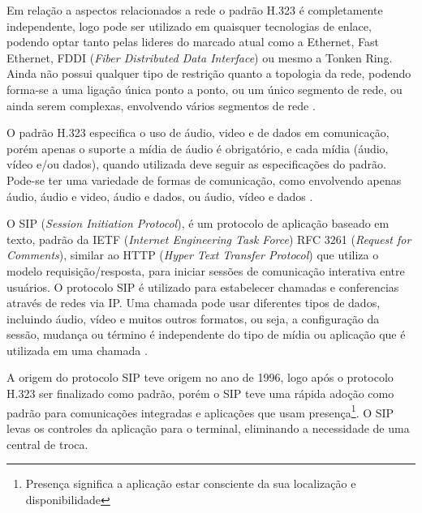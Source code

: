 Em relação a aspectos relacionados a rede o padrão H.323 é completamente independente, logo pode ser utilizado em quaisquer  tecnologias de enlace, podendo optar tanto pelas lideres do marcado atual como a Ethernet, Fast Ethernet, FDDI (\textit{Fiber Distributed Data Interface}) ou mesmo a Tonken Ring. Ainda não possui qualquer tipo de restrição quanto a topologia da rede, podendo forma-se a uma ligação única ponto a ponto, ou um único segmento de rede, ou ainda serem complexas, envolvendo vários segmentos de rede \cite{eduardomaronasmonks2006}.

O padrão H.323 especifica o uso de  áudio, video e de dados em comunicação, porém apenas o suporte a mídia de áudio é obrigatório, e cada mídia (áudio, vídeo e/ou dados), quando utilizada deve seguir as especificações do padrão. Pode-se ter uma variedade de formas de comunicação, como envolvendo apenas áudio, áudio e video, áudio e dados, ou áudio, vídeo e dados \cite{glauciadasilvaribeiro2011}.

O SIP (\textit{Session Initiation Protocol}), é um protocolo de aplicação baseado em texto, padrão da IETF (\textit{Internet Engineering Task Force}) RFC 3261 (\textit{Request for Comments}), similar ao HTTP (\textit{Hyper Text Transfer Protocol}) que utiliza o modelo requisição/resposta, para iniciar sessões de comunicação interativa entre usuários. O protocolo SIP é utilizado para estabelecer chamadas e conferencias através de redes via IP. Uma chamada pode usar diferentes tipos de dados, incluindo áudio, vídeo e muitos outros formatos, ou seja, a configuração da sessão, mudança ou término é independente do tipo de mídia ou aplicação que é utilizada em uma chamada \cite{adrianoramosgoncalves2001}.

A origem do protocolo SIP teve origem no ano de 1996, logo após o protocolo H.323 ser finalizado como padrão, porém o SIP teve uma rápida adoção como padrão para comunicações integradas e aplicações que usam presença\footnote{Presença significa a aplicação estar consciente da sua localização e disponibilidade}. O SIP levas os controles da aplicação para o terminal, eliminando a necessidade de uma central de troca.

